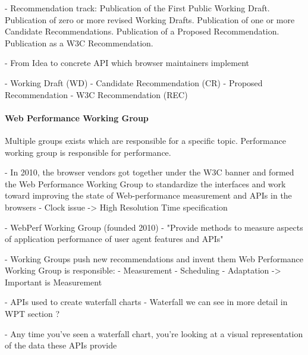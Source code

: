 - Recommendation track:
Publication of the First Public Working Draft.
Publication of zero or more revised Working Drafts.
Publication of one or more Candidate Recommendations.
Publication of a Proposed Recommendation.
Publication as a W3C Recommendation.

- From Idea to concrete API which browser maintainers implement

- Working Draft (WD)
- Candidate Recommendation (CR)
- Proposed Recommendation
- W3C Recommendation (REC)





\paragraph{Web Performance Working Group}



Multiple groups exists which are responsible for a specific topic.
Performance working group is responsible for performance.

- In 2010, the browser vendors got together under the W3C banner and formed the Web Performance Working Group to standardize the interfaces and work toward improving the state of Web-performance measurement and APIs in the browsers
- Clock issue -> High Resolution Time specification

- WebPerf Working Group (founded 2010)
- "Provide methods to measure aspects of application performance of user agent features and APIs"

- Working Groups push new recommendations and invent them
Web Performance Working Group is responsible:
- Measurement
- Scheduling
- Adaptation
-> Important is Measurement


- APIs used to create waterfall charts
- Waterfall we can see in more detail in WPT section ?

- Any time you've seen a waterfall chart, you're looking at a visual representation of the data these APIs provide




